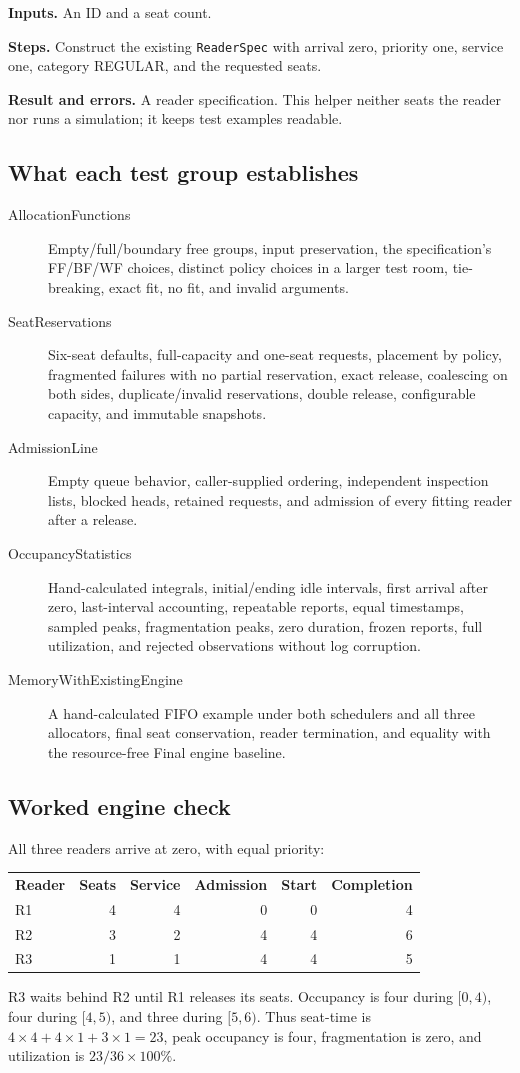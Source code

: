 \documentclass[11pt,a4paper]{article}
\newcommand{\arguments}{\textbf{Inputs.} }
\newcommand{\steps}{\textbf{Steps.} }
\newcommand{\result}{\textbf{Result and errors.} }
\begin{document}
\arguments An ID and a seat count.

\steps Construct the existing \texttt{ReaderSpec} with arrival zero,
priority one, service one, category REGULAR, and the requested seats.

\result A reader specification. This helper neither seats the reader nor
runs a simulation; it keeps test examples readable.

\subsection{What each test group establishes}
\begin{description}
\item[AllocationFunctions] Empty/full/boundary free groups, input preservation,
the specification's FF/BF/WF choices, distinct policy choices in a larger test
room, tie-breaking, exact fit, no fit, and invalid arguments.
\item[SeatReservations] Six-seat defaults, full-capacity and one-seat
requests, placement by policy, fragmented failures with no partial reservation,
exact release, coalescing on both sides, duplicate/invalid reservations,
double release, configurable capacity, and immutable snapshots.
\item[AdmissionLine] Empty queue behavior, caller-supplied ordering,
independent inspection lists, blocked heads, retained requests, and admission
of every fitting reader after a release.
\item[OccupancyStatistics] Hand-calculated integrals, initial/ending idle
intervals, first arrival after zero, last-interval accounting, repeatable reports,
equal timestamps, sampled peaks, fragmentation peaks, zero duration, frozen
reports, full utilization, and rejected observations without log corruption.
\item[MemoryWithExistingEngine] A hand-calculated FIFO example under both
schedulers and all three allocators, final seat conservation, reader termination,
and equality with the resource-free Final engine baseline.
\end{description}

\subsection{Worked engine check}
All three readers arrive at zero, with equal priority:
\begin{center}
\begin{tabular}{lrrrrr}
\textbf{Reader} & \textbf{Seats} & \textbf{Service} & \textbf{Admission} & \textbf{Start} & \textbf{Completion} \\
R1 & 4 & 4 & 0 & 0 & 4 \\
R2 & 3 & 2 & 4 & 4 & 6 \\
R3 & 1 & 1 & 4 & 4 & 5
\end{tabular}
\end{center}
R3 waits behind R2 until R1 releases its seats. Occupancy is four during
$[0,4)$, four during $[4,5)$, and three during $[5,6)$.
Thus seat-time is $4\times4+4\times1+3\times1=23$, peak occupancy is four,
fragmentation is zero, and utilization is $23/36\times100\%$.
\end{document}
